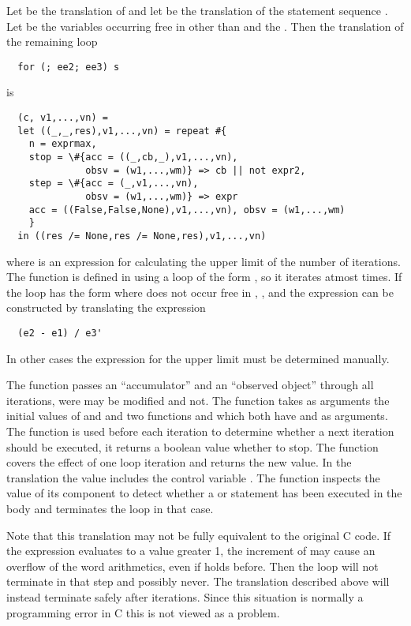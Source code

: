 Let  be the translation of  and let  be the translation of 
the statement sequence . Let  be the variables occurring free in  other than 
 and the .
Then the translation of the remaining loop 
\begin{verbatim}
  for (; ee2; ee3) s
\end{verbatim}
is
\begin{verbatim}
  (c, v1,...,vn) =
  let ((_,_,res),v1,...,vn) = repeat #{
    n = exprmax,
    stop = \#{acc = ((_,cb,_),v1,...,vn), 
              obsv = (w1,...,wm)} => cb || not expr2,
    step = \#{acc = (_,v1,...,vn), 
              obsv = (w1,...,wm)} => expr
    acc = ((False,False,None),v1,...,vn), obsv = (w1,...,wm)
    }
  in ((res /= None,res /= None,res),v1,...,vn)
\end{verbatim}
where  is an expression for calculating the upper limit of the number of iterations. The 
function is defined in  using a  loop of the form , so it iterates atmost
 times. If the loop has the form  where  does not occur free in ,
, and  the expression  can be constructed by translating the  expression
\begin{verbatim}
  (e2 - e1) / e3'
\end{verbatim}
In other cases the expression for the upper limit must be determined manually.

The  function passes an ``accumulator''  and an ``observed object''  through all
iterations, were  may be modified and  not. The  function takes as arguments the 
initial values of  and  and two functions  and  which both have 
and  as arguments. The  function is used before each iteration to determine whether a next iteration
should be executed, it returns a boolean value whether to stop.  The  function covers the effect of one loop iteration and returns the 
new  value. In the translation the  value includes the control variable . The 
function inspects the value of its  component to detect whether a  or  statement
has been executed in the body and terminates the loop in that case.

Note that this translation may not be fully equivalent to the original C code. If the expression  evaluates 
to a value greater 1, the increment of  may cause an overflow of the word arithmetics, even if 
holds before. Then the loop will not terminate in that step and possibly never. The translation described above will
instead terminate safely after  iterations. Since this situation is normally a programming error in C
this is not viewed as a problem.

